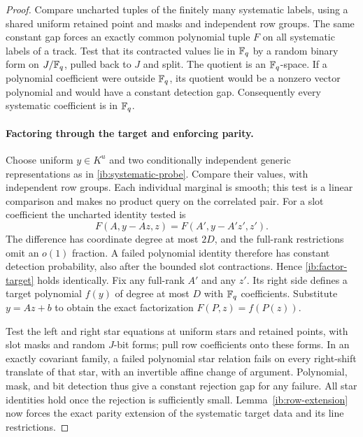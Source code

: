 \begin{proof}
Compare uncharted tuples of the finitely many systematic labels,
using a shared uniform retained point and masks and independent row
groups.  The same constant gap forces an exactly common polynomial
tuple \(F\) on all systematic labels of a track.  Test that its
contracted values lie in \(\mathbb{F}_q\) by a random binary form on
\(J/\mathbb{F}_q\), pulled back to \(J\) and split.  The quotient is an
\(\mathbb{F}_q\)-space.  If a polynomial coefficient were outside
\(\mathbb{F}_q\), its quotient would be a nonzero vector polynomial and
would have a constant detection gap.  Consequently every systematic
coefficient is in \(\mathbb{F}_q\).

\paragraph{Factoring through the target and enforcing parity.}
Choose uniform \(y\in K^u\) and two conditionally independent
generic representations as in \eqref{ib:systematic-probe}.  Compare
their values, with independent row groups.  Each individual marginal
is smooth; this test is a linear comparison and makes no product
query on the correlated pair.  For a slot coefficient the uncharted
identity tested is
\begin{equation}
 F(A,y-Az,z)=F(A',y-A'z',z').
 \label{ib:factor-target}
\end{equation}
The difference has coordinate degree at most \(2D\), and the
full-rank restrictions omit an \(o(1)\) fraction.  A failed
polynomial identity therefore has constant detection probability,
also after the bounded slot contractions.  Hence
\eqref{ib:factor-target} holds identically.  Fix any full-rank
\(A'\) and any \(z'\).  Its right side defines a target polynomial
\(f(y)\) of degree at most \(D\) with \(\mathbb{F}_q\) coefficients.
Substitute \(y=Az+b\) to obtain the exact factorization
\(F(P,z)=f(P(z))\).

Test the left and right star equations at uniform stars and retained
points, with slot masks and random \(J\)-bit forms; pull row
coefficients onto these forms.  In an exactly covariant family, a
failed polynomial star relation fails on every right-shift translate
of that star, with an invertible affine change of argument.
Polynomial, mask, and bit detection thus give a constant rejection
gap for any failure.  All star identities hold once the rejection is
sufficiently small.  Lemma~\ref{ib:row-extension} now forces the
exact parity extension of the systematic target data and its line
restrictions.


\end{proof}
